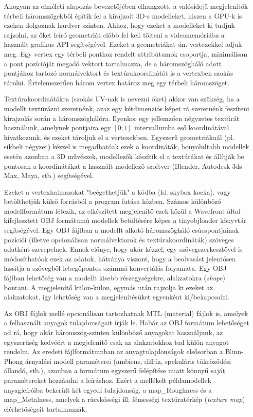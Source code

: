 Ahogyan az elméleti alapozás bevezetőjében elhangzott, a valósidejű megjelenítők térbeli háromszögekből építik fel a kirajzolt 3D-s modelleket, hiszen a GPU-k is ezeken dolgoznak hardver szinten. Ahhoz, hogy ezeket a modelleket ki tudjuk rajzolni, az őket leíró geometriát előbb fel kell tölteni a videomemóriába a használt grafikus API segítségével. Ezeket a geometriákat ún. vertexekkel adjuk meg. Egy vertex egy térbeli ponthoz rendelt attribútumok csoportja, minimálisan a pont pozícióját megadó vektort tartalmazza, de a háromszögháló adott pontjához tartozó normálvektort és textúrakoordinátát is a vertexben szokás tárolni. Értelemszerűen három vertex határoz meg egy térbeli háromszöget.

Textúrakoordinátákra (szokás UV-nak is nevezni őket) akkor van szükség, ha a modellt textúrázni szeretnénk, azaz egy kétdimenziós képet rá szeretnénk feszíteni kirajzolás során a háromszöghálóra. Ilyenkor egy jellemzően négyzetes textúrát használunk, amelynek pontjaira egy \([0; 1]\) intervallumba eső koordinátával hivatkozunk, és ezeket tároljuk el a vertexekben. Egyszerű geometriáknál (pl. síkbeli négyzet) kézzel is megadhatóak ezek a koordináták, bonyolultabb modellek esetén azonban a 3D művészek, modellezők készítik el a textúrákat és állítják be pontosan a koordinátákat a használt modellező szoftver (Blender, Autodesk 3ds Max, Maya, stb.) segítségével.

Ezeket a vertexhalmazokat "beégethetjük" a kódba (ld. skybox kocka), vagy betölthetjük külső forrásból a program futása közben. Számos különböző modellformátum létezik, az elkészített megjelenítő ezek közül a Wavefront által kifejlesztett OBJ formátumú modellek betöltésére képes a tinyobjloader könyvtár segítségével. Egy OBJ fájlban a modellt alkotó háromszögháló csúcspontjainak pozíciói (illetve opcionálisan normálvektorok és textúrakoordináták) szöveges adatként szerepelnek. Ennek előnye, hogy akár kézzel, egy szövegszerkesztővel is módosíthatóak ezek az adatok, hátránya viszont, hogy a beolvasást jelentősen lassítja a szövegből lebegőpontos számmá konvertálás folyamata. Egy OBJ fájlban lehetőség van a modellt kisebb részegységekre, alakzatokra (\textit{shape}) bontani. A megjelenítő külön-külön, egymás után rajzolja ki ezeket az alakzatokat, így lehetőség van a megjelenítésüket egyenként ki/bekapcsolni.

Az OBJ fájlok mellé opcionálisan tartozhatnak MTL (material) fájlok is, amelyek a felhasznált anyagok tulajdonságait írják le. Habár az OBJ formátum lehetőséget ad rá, hogy akár háromszög-szinten különböző anyagokat használjunk, az egyszerűség kedvéért a megjelenítő csak az alakzatokhoz tud külön anyagot rendelni. Az eredeti fájlformátumban az anyagtulajdonságok elsősorban a Blinn-Phong árnyalási modell paraméterei (ambiens, diffúz, spekuláris tükröződési állandó, stb.), azonban a formátum egyszerű felépítése miatt könnyű saját paramétereket hozzáadni a leíráshoz. Ezért a mellékelt példamodellek anyagleíróiba bekerült két egyedi tulajdonság, a map\_Roughness és a map\_Metalness, amelyek a rücskösségi ill. fémességi textúratérkép (\textit{texture map}) elérhetőségeit tartalmazzák.

